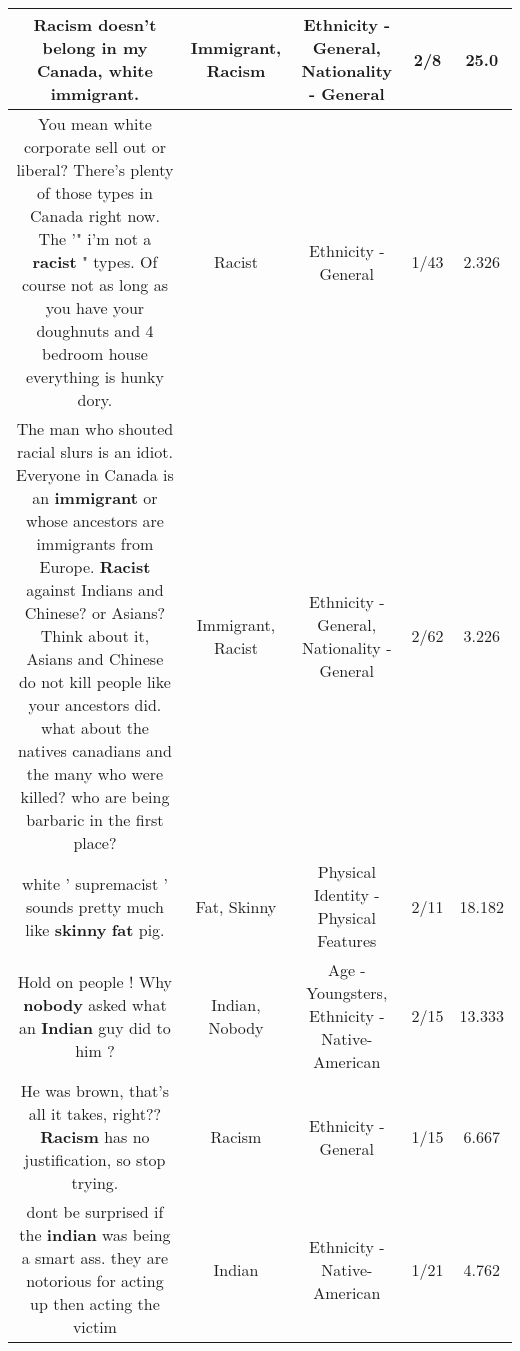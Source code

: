 \documentclass[11pt]{article}
\newlength\mylength
\begin{document}
\begin{center}
\begin{longtable}{|C{.65\mylength}|C{.30\mylength}|C{.12\mylength}|C{.12\mylength}|C{.12\mylength}|}
  \small Racism doesn't belong in my Canada, white \textbf{immigrant}.\normalsize   & Immigrant, Racism & Ethnicity - General, Nationality - General & 2/8 & 25.0 \\  \hline
  \small You mean white corporate sell out or liberal?  There's plenty of those types in Canada right now. The '" i'm not  a \textbf{racist} " types. Of course not as long as you have your doughnuts and 4 bedroom house everything is hunky dory.\normalsize   & Racist & Ethnicity - General & 1/43 & 2.326 \\  \hline
  \small The man who shouted racial slurs is an idiot. Everyone in Canada is an \textbf{immigrant} or whose ancestors are immigrants from Europe. \textbf{Racist} against Indians and Chinese? or Asians?Think about it, Asians and Chinese do not kill people like your ancestors did. what about the natives canadians and the many who were killed? who are being barbaric in the first place?\normalsize   & Immigrant, Racist & Ethnicity - General, Nationality - General & 2/62 & 3.226 \\  \hline
  \small white ' supremacist ' sounds pretty much like \textbf{skinny} \textbf{fat} pig.\normalsize   & Fat, Skinny & Physical Identity - Physical Features & 2/11 & 18.182 \\  \hline
  \small Hold on people ! Why \textbf{nobody} asked what an \textbf{Indian} guy did to him ?\normalsize   & Indian, Nobody & Age - Youngsters, Ethnicity - Native-American & 2/15 & 13.333 \\  \hline
  \small He was brown, that's all it takes, right?? \textbf{Racism} has no justification, so stop trying.\normalsize   & Racism & Ethnicity - General & 1/15 & 6.667 \\  \hline
  \small dont be surprised if the \textbf{indian} was being a smart ass. they are notorious for acting up then acting the victim\normalsize   & Indian & Ethnicity - Native-American & 1/21 & 4.762 \\  \hline

\end{longtable}
\end{center}
\end{document}
